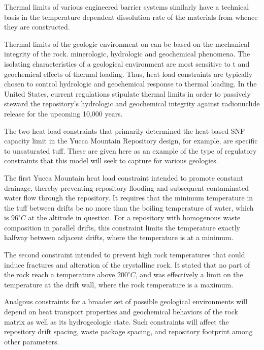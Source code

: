 Thermal limits of various engineered barrier systems similarly have a technical 
basis in the temperature dependent dissolution rate of the materials from whence 
they are constructed.  

Thermal limits of the geologic environment on can be based on the mechanical 
integrity of the rock.  minerologic, hydrologic and geochemical phenomena. The 
isolating characteristics of a geological environment are most sensitive to t  
and geochemical effects of thermal loading. Thus, heat load constraints are 
typically chosen to control hydrologic and geochemical response to thermal 
loading. In the United States, current regulations stipulate thermal limits in 
order to passively steward the repository's hydrologic and geochemical integrity 
against radionuclide  release for the upcoming 10,000 years.

The two heat load constraints that primarily determined the heat-based SNF 
capacity limit in the Yucca Mountain Repository design, for example, are 
specific to unsaturated tuff. These are given here as an example of the type of 
regulatory constraints that this model will seek to capture for various 
geologies. 

The first Yucca Mountain heat load constraint intended to promote constant 
drainage, thereby preventing repository flooding and subsequent contaminated 
water flow through the repository. It requires that the minimum temperature in 
the tuff between drifts be no  more than the boiling temperature of water, which 
is $96^{\circ}C$ at the altitude in question. For a repository with homogenous 
waste composition in parallel drifts, this constraint limits the temperature 
exactly halfway between adjacent drifts, where the temperature is at a minimum.

The second constraint intended to prevent high rock temperatures that could 
induce fractures and alteration of the crystalline rock. It stated that no part 
of the rock reach a temperature above $200^{\circ}C$, and was effectively a 
limit on the temperature at the drift wall, where the rock temperature is a 
maximum.  

Analgous constraints for a broader set of possible geological environments will 
depend on heat transport properties and geochemical behaviors of the rock matrix 
as well as its hydrogeologic state.  Such constraints will affect the  
repository drift spacing, waste package spacing, and repository footprint among 
other parameters. 



